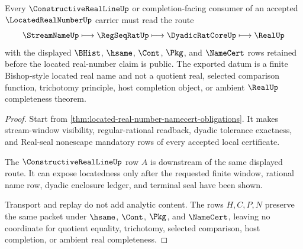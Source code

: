 \begin{theorem}
\label{thm:located-real-number-regseqrat-handoff}
Every $\ConstructiveRealLineUp$ or completion-facing consumer of an accepted $\LocatedRealNumberUp$ carrier must read the route
$$
\StreamNameUp \longmapsto \RegSeqRatUp \longmapsto \DyadicRatCoreUp \longmapsto \RealUp
$$
with the displayed $\BHist$, $\hsame$, $\Cont$, $\Pkg$, and $\NameCert$ rows retained before the located real-number claim is public. The exported datum is a finite Bishop-style located real name and not a quotient real, selected comparison function, trichotomy principle, host completion object, or ambient $\RealUp$ completeness theorem.
\end{theorem}
\begin{proof}
Start from \autoref{thm:located-real-number-namecert-obligations}. It makes stream-window visibility, regular-rational readback, dyadic tolerance exactness, and Real-seal nonescape mandatory rows of every accepted local certificate.

The $\ConstructiveRealLineUp$ row $A$ is downstream of the same displayed route. It can expose locatedness only after the requested finite window, rational name row, dyadic enclosure ledger, and terminal seal have been shown.

Transport and replay do not add analytic content. The rows $H,C,P,N$ preserve the same packet under $\hsame$, $\Cont$, $\Pkg$, and $\NameCert$, leaving no coordinate for quotient equality, trichotomy, selected comparison, host completion, or ambient real completeness.
\end{proof}




